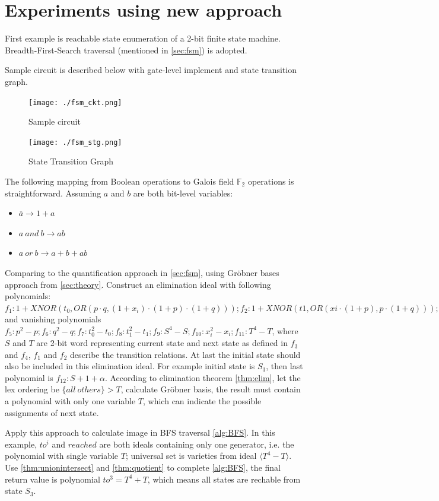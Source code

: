 \section{Experiments using new approach}
\label{sec:exp}

First example is reachable state enumeration of a 2-bit finite state machine.
Breadth-First-Search traversal (mentioned in \ref{sec:fsm}) is adopted.

\begin{Example}
\label{ex:traversal}
Sample circuit is described below with gate-level implement and state transition
graph.
  \begin{figure}[hbt]
    \centerline{\texttt{[image: ./fsm\_ckt.png]}}
    \caption{Sample circuit}
  \label{fig:fsmckt}
  \end{figure}

  \begin{figure}[hbt]
    \centerline{\texttt{[image: ./fsm\_stg.png]}}
    \caption{State Transition Graph}
  \label{fig:fsmstg}
  \end{figure}

The following mapping from Boolean operations to Galois field $\mathbb{F}_2$ 
operations is straightforward. Assuming $a$ and $b$ are both bit-level variables:
\begin{itemize}
  \item $\overline{a} \rightarrow 1 + a$
  \item $a\ and\ b \rightarrow ab$
  \item $a\ or\ b \rightarrow a + b + ab$
\end{itemize}
Comparing to the quantification approach in \ref{sec:fsm}, using Gr\"obner bases
approach from \ref{sec:theory}. Construct an elimination ideal with following 
polynomials: $f_1: 1 + XNOR(t_0, OR(p\cdot q, (1 + x_i)\cdot(1 + p)\cdot(1 + q))); 
f_2: 1 + XNOR(t1, OR(xi\cdot(1+p),p\cdot(1+q))); f_3: S - p - q\cdot\alpha; 
f_4: T - t_0 - t_1\cdot \alpha$ and vanishing polynomials $f_5: p^2 - p; 
f_6: q^2 - q; f_7: t_0^2 - t_0; f_8: t_1^2 - t_1; f_9: S^4 - S; f_{10}: x_i^2 - x_i; 
f_{11}: T^4 - T$, where $S$ and $T$ are 2-bit word representing current state
and next state as defined in $f_3$ and $f_4$, $f_1$ and $f_2$ describe the 
transition relations. At last the initial state should also be included in 
this elimination ideal. For example initial state is $S_3$, then last polynomial
is $f_{12}: S + 1 + \alpha$. According to elimination theorem \ref{thm:elim},
let the lex ordering be $\{all\ others\} > T$, calculate Gr\"obner basis, the 
result must contain a polynomial with only one variable $T$, which can indicate
the possible assignments of next state. \par

Apply this approach to calculate image in BFS traversal \ref{alg:BFS}.
In this example, $to^i$ and $reached$ are both ideals containing only one
generator, i.e. the polynomial with single variable $T$; universal set is
varieties from ideal $\langle T^4 - T\rangle$. Use \ref{thm:unionintersect} and
\ref{thm:quotient} to complete \ref{alg:BFS}, the final return value is 
polynomial $to^3 = T^4 + T$, which means all states are rechable from state $S_3$.
\end{Example}


